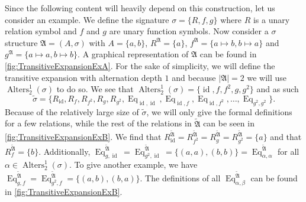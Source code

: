 Since the following content will heavily depend on this construction, let us consider an example.
We define the signature $\sigma=\{R,f,g\}$ where $R$ is a unary relation symbol and $f$ and $g$ are unary function symbols.
Now consider a $\sigma$ structure $\mathfrak A=(A,\sigma)$ with $A=\{a,b\}$, $R^{\mathfrak A}=\{a\}$, $f^{\mathfrak A}=\{a\mapsto b, b\mapsto a\}$ and $g^{\mathfrak A}=\{a\mapsto a, b\mapsto b\}$.
A graphical representation of $\mathfrak A$ can be found in \cref{fig:TransitiveExpansionExA}.
For the sake of simplicity, we will define the transitive expansion with alternation depth $1$ and because $\vert\mathfrak A\vert=2$ we will use $\operatorname{Alters}^1_2(\sigma)$ to do so.
We see that $\operatorname{Alters}^1_2(\sigma)=\{\operatorname{id}, f,f^2,g,g^2\}$ and as such 
$$\widetilde{\sigma}=\{R_{\operatorname{id}}, R_{f}, R_{f^2}, R_g, R_{g^2}, \operatorname{Eq}_{\operatorname{id},\operatorname{id}}, \operatorname{Eq}_{\operatorname{id},f}, \operatorname{Eq}_{\operatorname{id}, f^2}, \dots, \operatorname{Eq}_{g^2, g^2}\}.$$
Because of the relatively large size of $\widetilde{\sigma}$, we will only give the formal definitions for a few relations, while the rest of the relations in $\widetilde{\mathfrak A}$ can be seen in \cref{fig:TransitiveExpansionExB}.
We find that $R^{\widetilde{\mathfrak A}}_{\operatorname{id}}=R^{\widetilde{\mathfrak A}}_{f^2}=R^{\widetilde{\mathfrak A}}_g=R^{\widetilde{\mathfrak A}}_{g^2}=\{a\}$ and that $R^{\widetilde{\mathfrak A}}_f=\{b\}$.
Additionally, $\operatorname{Eq}^{\widetilde{\mathfrak A}}_{g,\operatorname{id}}=\operatorname{Eq}^{\widetilde{\mathfrak A}}_{g^2,\operatorname{id}}=\{(a,a),(b,b)\}=\operatorname{Eq}^{\widetilde{\mathfrak A}}_{\alpha,\alpha}$ for all $\alpha\in\operatorname{Alters}^1_2(\sigma)$.
To give another example, we have $\operatorname{Eq}^{\widetilde{\mathfrak A}}_{g,f}=\operatorname{Eq}^{\widetilde{\mathfrak A}}_{g^2,f}=\{(a,b),(b,a)\}$.
The definitions of all $\operatorname{Eq}^{\widetilde{\mathfrak A}}_{\alpha,\beta}$ can be found in \cref{fig:TransitiveExpansionExB}.

